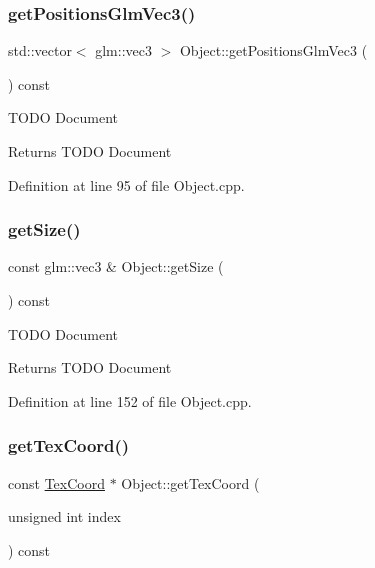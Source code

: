 \mbox{\label{class_object_a1d0e144917e58aab0c97e15c796c08dd}} 
\subsubsection{\texorpdfstring{get\+Positions\+Glm\+Vec3()}{getPositionsGlmVec3()}}
{\footnotesize\ttfamily std\+::vector$<$ glm\+::vec3 $>$ Object\+::get\+Positions\+Glm\+Vec3 (\begin{DoxyParamCaption}{ }\end{DoxyParamCaption}) const}

T\+O\+DO Document \begin{DoxyReturn}{Returns}
T\+O\+DO Document 
\end{DoxyReturn}


Definition at line 95 of file Object.\+cpp.

\mbox{\label{class_object_ac4f74b9b50fb83829b6844a2591ba50f}} 
\subsubsection{\texorpdfstring{get\+Size()}{getSize()}}
{\footnotesize\ttfamily const glm\+::vec3 \& Object\+::get\+Size (\begin{DoxyParamCaption}{ }\end{DoxyParamCaption}) const}

T\+O\+DO Document \begin{DoxyReturn}{Returns}
T\+O\+DO Document 
\end{DoxyReturn}


Definition at line 152 of file Object.\+cpp.

\mbox{\label{class_object_a703e8fc9f5aa16d5b657ed8f03f4cf02}} 
\subsubsection{\texorpdfstring{get\+Tex\+Coord()}{getTexCoord()}}
{\footnotesize\ttfamily const \hyperlink{struct_tex_coord}{Tex\+Coord} $\ast$ Object\+::get\+Tex\+Coord (\begin{DoxyParamCaption}\item[{unsigned int}]{index }\end{DoxyParamCaption}) const}

